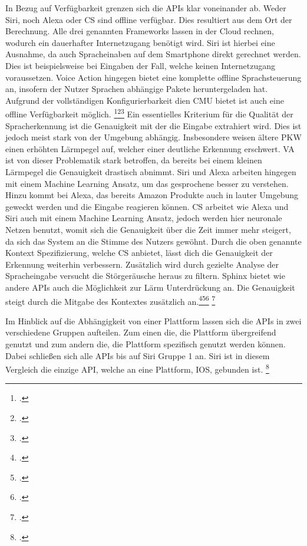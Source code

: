 In Bezug auf Verfügbarkeit grenzen sich die \ac{API}s klar voneinander ab. Weder Siri, noch Alexa oder \ac{CS} sind offline verfügbar. Dies resultiert aus dem Ort der Berechnung. Alle drei genannten Frameworks lassen in der Cloud rechnen, wodurch ein dauerhafter Internetzugang benötigt wird. Siri ist hierbei eine Ausnahme, da auch Spracheinaben auf dem Smartphone direkt gerechnet werden. Dies ist beispielsweise bei Eingaben der Fall, welche keinen Internetzugang voraussetzen. Voice Action hingegen bietet eine komplette offline Sprachsteuerung an, insofern der Nutzer Sprachen abhängige Pakete heruntergeladen hat.
Aufgrund der vollständigen Konfigurierbarkeit dien \ac{CMU} bietet ist auch eine offline Verfügbarkeit möglich.
\footcite[vgl.:][]{howSiriWork}\footcite[vgl.:][]{alexaHow}\footcite[vgl.:][]{cloudSpeechAPI}
Ein essentielles Kriterium für die Qualität der Spracherkennung ist die Genauigkeit mit der die Eingabe extrahiert wird. Dies ist jedoch meist stark von der Umgebung abhängig. Insbesondere weisen ältere PKW einen erhöhten Lärmpegel auf, welcher einer deutliche Erkennung erschwert. \ac{VA} ist von dieser Problematik stark betroffen, da bereits bei einem kleinen Lärmpegel die Genauigkeit drastisch abnimmt. Siri und Alexa arbeiten hingegen mit einem Machine Learning Ansatz, um das gesprochene besser zu verstehen. Hinzu kommt bei Alexa, das bereits Amazon Produkte auch in lauter Umgebung geweckt werden und die Eingabe reagieren können. \ac{CS} arbeitet wie Alexa und Siri auch mit einem Machine Learning Ansatz, jedoch werden hier neuronale Netzen benutzt, womit sich die Genauigkeit über die Zeit immer mehr steigert, da sich das System an die Stimme des Nutzers gewöhnt. Durch die oben genannte Kontext Spezifizierung, welche \ac{CS} anbietet, lässt dich die Genauigkeit der Erkennung weiterhin verbessern. Zusätzlich wird durch gezielte Analyse der Spracheingabe versucht die Störgeräusche heraus zu filtern. Sphinx bietet wie andere \ac{API}s auch die Möglichkeit zur Lärm Unterdrückung an. Die Genauigkeit steigt durch die Mitgabe des Kontextes zusätzlich an.\footcite[vlg.:][S. 7 f.]{alexaHowTo}\footcite[vgl.:][]{howSiriWork}\footcite[vgl.:][]{alexaHow} \footcite[vgl.:][]{cloudSpeechAPI}

Im Hinblick auf die Abhängigkeit von einer Plattform lassen sich die \ac{API}s in zwei verschiedene Gruppen aufteilen. Zum einen die, die Plattform übergreifend genutzt und zum andern die, die Plattform spezifisch genutzt werden können. Dabei schließen sich alle \ac{API}s bis auf Siri Gruppe 1 an. Siri ist in diesem Vergleich die einzige \ac{API}, welche an eine Plattform, IOS, gebunden ist.
\footcite[vgl.:][]{Siriexplained} 

